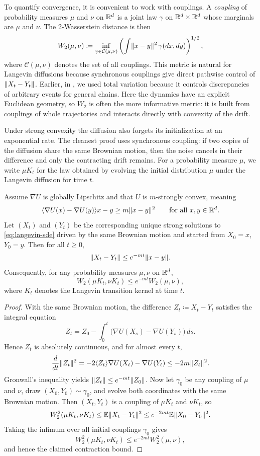 To quantify convergence, it is convenient to work with couplings.
A \emph{coupling} of probability measures \(\mu\) and \(\nu\) on \(\mathbb{R}^d\) is a joint law \(\gamma\) on \(\mathbb{R}^d\times\mathbb{R}^d\) whose marginals are \(\mu\) and \(\nu\).
The 2-Wasserstein distance is then
\[
  W_2(\mu,\nu)
  \coloneqq
  \inf_{\gamma\in\mathcal{C}(\mu,\nu)}
  \left(\int \lVert x-y\rVert^2\,\gamma(dx,dy)\right)^{1/2},
\]
where \(\mathcal{C}(\mu,\nu)\) denotes the set of all couplings.
This metric is natural for Langevin diffusions because synchronous couplings give direct pathwise control of \(\lVert X_t-Y_t\rVert\).
Earlier, in , we used total variation because it controls discrepancies of arbitrary events for general chains.
Here the dynamics have an explicit Euclidean geometry, so \(W_2\) is often the more informative metric: it is built from couplings of whole trajectories and interacts directly with convexity of the drift.

Under strong convexity the diffusion also forgets its initialization at an exponential rate.
The cleanest proof uses synchronous coupling: if two copies of the diffusion share the same Brownian motion, then the noise cancels in their difference and only the contracting drift remains.
For a probability measure \(\mu\), we write \(\mu K_t\) for the law obtained by evolving the initial distribution \(\mu\) under the Langevin diffusion for time \(t\).

\begin{proposition}
\label{prop:langevin-w2-contraction}
Assume $\nabla U$ is globally Lipschitz and that $U$ is $m$-strongly convex, meaning
\[
  \langle\nabla U(x)-\nabla U(y)\rangle{x-y} \ge m\lVert x-y\rVert^2
  \qquad
  \text{for all }x,y\in\mathbb{R}^d.
\]
Let $(X_t)$ and $(Y_t)$ be the corresponding unique strong solutions to \eqref{eq:langevin-sde} driven by the same Brownian motion and started from $X_0=x$, $Y_0=y$.
Then for all $t\ge 0$,
\[
  \lVert X_t-Y_t\rVert\le e^{-mt}\lVert x-y\rVert.
\]
Consequently, for any probability measures $\mu,\nu$ on $\mathbb{R}^d$,
\[
  W_2(\mu K_t,\nu K_t)\le e^{-mt}W_2(\mu,\nu),
\]
where $K_t$ denotes the Langevin transition kernel at time $t$.
\end{proposition}
\begin{proof}
With the same Brownian motion, the difference $Z_t\coloneqq X_t-Y_t$ satisfies the integral equation
\[
  Z_t = Z_0 - \int_0^t \bigl(\nabla U(X_s)-\nabla U(Y_s)\bigr)\,ds.
\]
Hence $Z_t$ is absolutely continuous, and for almost every $t$,
\[
  \frac{d}{dt}\lVert Z_t\rVert^2
  =
  -2\langle Z_t\rangle{\nabla U(X_t)-\nabla U(Y_t)}
  \le
  -2m\lVert Z_t\rVert^2.
\]
Gronwall's inequality yields $\lVert Z_t\rVert\le e^{-mt}\lVert Z_0\rVert$.
Now let $\gamma_0$ be any coupling of $\mu$ and $\nu$, draw $(X_0,Y_0)\sim\gamma_0$, and evolve both coordinates with the same Brownian motion.
Then $(X_t,Y_t)$ is a coupling of $\mu K_t$ and $\nu K_t$, so
\[
  W_2^2(\mu K_t,\nu K_t)
  \le
  \mathbb{E}\lVert X_t-Y_t\rVert^2
  \le
  e^{-2mt}\mathbb{E}\lVert X_0-Y_0\rVert^2.
\]
Taking the infimum over all initial couplings $\gamma_0$ gives
\[
  W_2^2(\mu K_t,\nu K_t)\le e^{-2mt}W_2^2(\mu,\nu),
\]
and hence the claimed contraction bound.
\end{proof}

